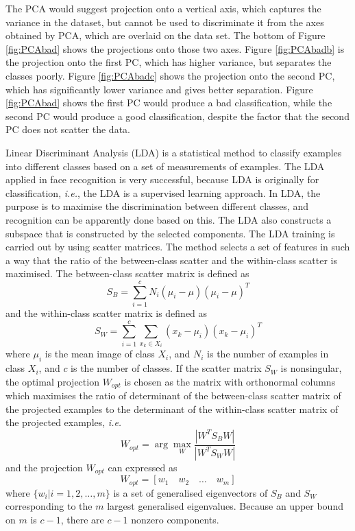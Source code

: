 The PCA would suggest projection onto a vertical axis, which captures the variance in the dataset, but cannot be used to discriminate it from the axes obtained by PCA, which are overlaid on the data set. The bottom of \mbox{Figure} \ref{fig:PCAbad} shows the projections onto those two axes. \mbox{Figure} \ref{fig:PCAbadb} is the projection onto the first PC, which has higher variance, but separates the classes poorly. \mbox{Figure} \ref{fig:PCAbadc} shows the projection onto the second PC, which has significantly lower variance and gives better separation. \mbox{Figure} \ref{fig:PCAbad} shows the first PC would produce a bad classification, while the second PC would produce a good classification, despite the factor that the second PC does not scatter the data.

Linear Discriminant Analysis (LDA) is a statistical method to classify examples into different classes based on a set of measurements of examples. The LDA applied in face recognition is very successful, because LDA is originally for classification, \textit{i.e.}, the LDA is a supervised learning approach. In LDA, the purpose is to maximise the discrimination between different classes, and recognition can be apparently done based on this. The LDA also constructs a subspace that is constructed by the selected components. The LDA training is carried out by using scatter matrices. The method selects a set of features in such a way that the ratio of the between-class scatter and the within-class scatter is maximised. The between-class scatter matrix is defined as
\begin{equation}
 S_B = \sum_{i=1}^c N_i (\mu_i-\mu)(\mu_i-\mu)^T
\end{equation}
and the within-class scatter matrix is defined as
\begin{equation}
 S_W = \sum_{i=1}^c \sum_{x_k \in X_i} (x_k-\mu_i) (x_k - \mu_i)^T
\end{equation}
where $\mu_i$ is the mean image of class $X_i$, and $N_i$ is the number of examples in class $X_i$, and $c$ is the number of classes. If the scatter matrix $S_W$ is nonsingular, the optimal projection $W_{opt}$ is chosen as the matrix with orthonormal columns which maximises the ratio of determinant of the between-class scatter matrix of the projected examples to the determinant of the within-class scatter matrix of the projected examples,\textit{ i.e.}
\begin{equation}
 W_{opt} = \arg \max_W \frac{|W^T S_B W|}{|W^T S_W W|}
\end{equation}
and the projection $W_{opt}$ can expressed as
\begin{equation}
 W_{opt} = [w_1\quad w_2 \quad \ldots \quad w_m]
\end{equation}
where $\{w_i|i=1,2,\ldots,m\}$ is a set of generalised eigenvectors of $S_B$ and $S_W$ corresponding to the $m$ largest generalised eigenvalues. Because an upper bound on $m$ is $c-1$, there are $c-1$ nonzero components.

